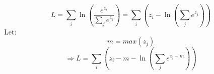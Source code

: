 \documentclass{article}
\begin{document}
    \[
        L = \sum_{i}\ln\left(
            \frac{e^{z_i}}{\sum_{j}e^{z_j}}
        \right) = 
        \sum_{i}\left(
            z_i - \ln\left(\sum_{j}e^{z_j}\right)
        \right)
    \]
    Let:
    \[
        m = max(z_j)
    \]
    \[
        \Rightarrow L = \sum_{i}\left(
            z_i - m - \ln\left(\sum_{j}e^{z_j - m}\right)
        \right)
    \]
\end{document}
